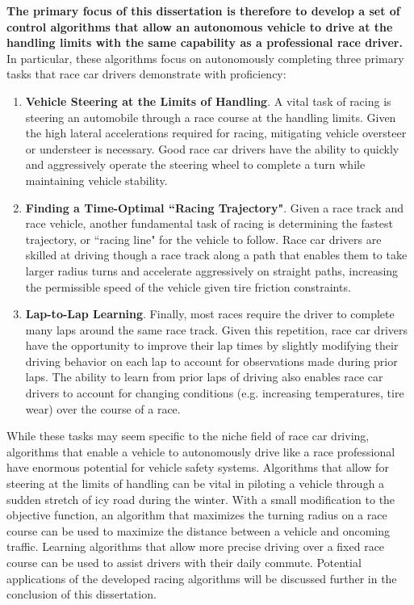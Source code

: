 \textbf{The primary focus of this dissertation is therefore to develop a set of control algorithms that allow an autonomous vehicle to drive at the handling limits with
the same capability as a professional race driver.} In particular, these algorithms focus on autonomously completing three primary tasks that race car drivers demonstrate with 
proficiency:

\begin{enumerate}
 		
  \item \textbf{Vehicle Steering at the Limits of Handling}. A vital task of racing is steering an automobile through a race course at the handling limits. Given the high lateral
  accelerations required for racing, mitigating vehicle oversteer or understeer is necessary. Good race car drivers have the ability to quickly and aggressively operate the
  steering wheel to complete a turn while maintaining vehicle stability.  
  
  \item \textbf{Finding a Time-Optimal ``Racing Trajectory"}. Given a race track and race vehicle, another fundamental task of racing is determining the fastest
		trajectory, or ``racing line" for the vehicle to follow. Race car drivers are skilled at driving though a race track along a path that enables them to take larger
		radius turns and accelerate aggressively on straight paths, increasing the permissible speed of the vehicle given tire friction constraints.
  
  \item \textbf{Lap-to-Lap Learning}. Finally, most races require the driver to complete many laps around the same race track. Given this repetition, 
	race car drivers have the opportunity to improve their lap times by slightly modifying their driving behavior on each lap to account for observations made during prior laps.
	The ability to learn from prior laps of driving also enables race car drivers to account for changing conditions (e.g. increasing temperatures, tire wear) over the course of a race.
  
\end{enumerate} 

While these tasks may seem specific to the niche field of race car driving, algorithms that enable a vehicle to autonomously drive like a race professional have 
enormous potential for vehicle safety systems. Algorithms that allow for steering at the limits of handling can be vital in piloting a vehicle through
a sudden stretch of icy road during the winter. With a small modification to the objective function, an algorithm that maximizes the turning radius on a race course can 
be used to maximize the distance between a vehicle and oncoming traffic. Learning algorithms that allow more precise driving over a fixed race course can be used to assist
drivers with their daily commute. Potential applications of the developed racing algorithms will be discussed further in the conclusion of this dissertation.

